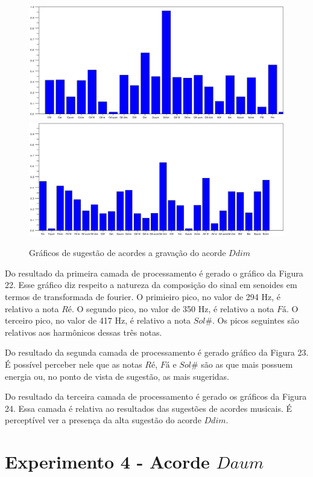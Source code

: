 \begin{figure}[h]
	\centering
		\includegraphics[keepaspectratio=true,scale=0.49]{figuras/Dm/acordes_1_Ddim.eps}
		\includegraphics[keepaspectratio=true,scale=0.49]{figuras/Dm/acordes_2_Ddim.eps}
	\caption{Gráficos de sugestão de acordes a gravação do acorde $Ddim$}
\end{figure}
\newpage

Do resultado da primeira camada de processamento é gerado o gráfico da Figura 22. Esse gráfico diz respeito a natureza da composição do sinal em senoides em termos de transformada de fourier. O primieiro pico, no valor de 294 Hz, é relativo a nota $Ré$. O segundo pico, no valor de 350 Hz, é relativo a nota $Fá$. O terceiro pico, no valor de 417 Hz, é relativo a nota $Sol\#$. Os picos seguintes são relativos aos harmônicos dessas três notas. 

Do resultado da segunda camada de processamento é gerado gráfico da Figura 23. É possível perceber nele que as notas $Ré$, $Fá$ e $Sol\#$ são as que mais possuem energia ou, no ponto de vista de sugestão, as mais sugeridas.

Do resultado da terceira camada de processamento é gerado os gráficos da Figura 24. Essa camada é relativa ao resultados das sugestões de acordes musicais. É perceptível ver a presença da alta sugestão do acorde $Ddim$.

\section{Experimento 4 - Acorde $Daum$}
\label{sec:experimento4}


